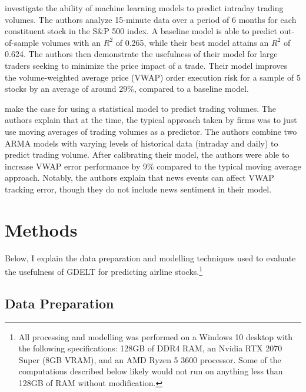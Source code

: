 \documentclass[12pt]{article}
\begin{document}
\citet{cucuringu2025forecasting} investigate the ability of machine learning models to predict intraday trading volumes. The authors analyze 15-minute data over a period of 6 months for each constituent stock in the S\&P 500 index. A baseline model is able to predict out-of-sample volumes with an $R^2$ of 0.265, while their best model attains an $R^2$ of 0.624. The authors then demonstrate the usefulness of their model for large traders seeking to minimize the price impact of a trade. Their model improves the volume-weighted average price (VWAP) order execution risk for a sample of 5 stocks by an average of around 29\%, compared to a baseline model.

\citet{satish2014predicting} make the case for using a statistical model to predict trading volumes. The authors explain that at the time,  the typical approach taken by firms was to just use moving averages of trading volumes as a predictor. The authors combine two ARMA models with varying levels of historical data (intraday and daily) to predict trading volume. After calibrating their model, the authors were able to increase VWAP error performance by 9\% compared to the typical moving average approach. Notably, the authors explain that news events can affect VWAP tracking error, though they do not include news sentiment in their model.

\section{Methods}
Below, I explain the data preparation and modelling techniques used to evaluate the usefulness of GDELT for predicting airline stocks.\footnote{All processing and modelling was performed on a Windows 10 desktop with the following specifications: 128GB of DDR4 RAM, an Nvidia RTX 2070 Super (8GB VRAM), and an AMD Ryzen 5 3600 processor. Some of the computations described below likely would not run on anything less than 128GB of RAM without modification.}
\subsection{Data Preparation}
\end{document}
